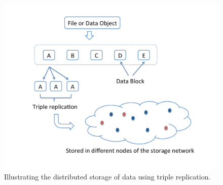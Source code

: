 		\begin{figure}[h!]
			\centering
			\includegraphics[scale=.4]{src/Figures/chap4/3rep}  
			\caption{Illustrating the distributed storage of data using triple replication.}\label{fig:3rep}    
		\end{figure}

